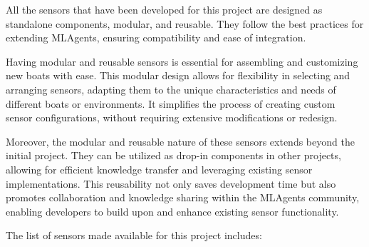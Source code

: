 \begin{textblock}
All the sensors that have been developed for this project are designed as standalone components, modular, and reusable. They follow the best practices for extending MLAgents, ensuring compatibility and ease of integration.

Having modular and reusable sensors is essential for assembling and customizing new boats with ease. This modular design allows for flexibility in selecting and arranging sensors, adapting them to the unique characteristics and needs of different boats or environments. It simplifies the process of creating custom sensor configurations, without requiring extensive modifications or redesign.

Moreover, the modular and reusable nature of these sensors extends beyond the initial project. They can be utilized as drop-in components in other projects, allowing for efficient knowledge transfer and leveraging existing sensor implementations. This reusability not only saves development time but also promotes collaboration and knowledge sharing within the MLAgents community, enabling developers to build upon and enhance existing sensor functionality.

The list of sensors made available for this project includes:
\end{textblock}


